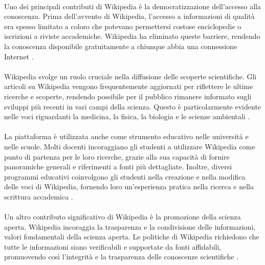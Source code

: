 \documentclass[12pt,a4paper]{report}
\begin{document}
\paragraph*{}
Uno dei principali contributi di Wikipedia è la democratizzazione dell'accesso alla conoscenza. Prima dell'avvento di Wikipedia, l'accesso a informazioni di qualità era spesso limitato a coloro che potevano permettersi costose enciclopedie o iscrizioni a riviste accademiche. Wikipedia ha eliminato queste barriere, rendendo la conoscenza disponibile gratuitamente a chiunque abbia una connessione Internet \cite{lih2009wikipedia}.

\paragraph*{}
Wikipedia svolge un ruolo cruciale nella diffusione delle scoperte scientifiche. Gli articoli su Wikipedia vengono frequentemente aggiornati per riflettere le ultime ricerche e scoperte, rendendo possibile per il pubblico rimanere informato sugli sviluppi più recenti in vari campi della scienza. Questo è particolarmente evidente nelle voci riguardanti la medicina, la fisica, la biologia e le scienze ambientali \cite{jemielniak2014wikipedia}.

\paragraph*{}
La piattaforma è utilizzata anche come strumento educativo nelle università e nelle scuole. Molti docenti incoraggiano gli studenti a utilizzare Wikipedia come punto di partenza per le loro ricerche, grazie alla sua capacità di fornire panoramiche generali e riferimenti a fonti più dettagliate. Inoltre, diversi programmi educativi coinvolgono gli studenti nella creazione e nella modifica delle voci di Wikipedia, fornendo loro un'esperienza pratica nella ricerca e nella scrittura accademica \cite{denning2005wikipedia}.

\paragraph*{}
Un altro contributo significativo di Wikipedia è la promozione della scienza aperta. Wikipedia incoraggia la trasparenza e la condivisione delle informazioni, valori fondamentali della scienza aperta. Le politiche di Wikipedia richiedono che tutte le informazioni siano verificabili e supportate da fonti affidabili, promuovendo così l'integrità e la trasparenza delle conoscenze scientifiche \cite{history_of_wikis}.
\end{document}
